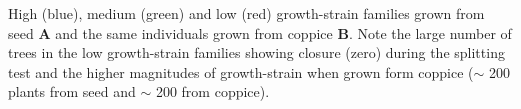 High (blue), medium (green) and low (red) growth-strain families grown from seed \textbf{A} and the same individuals grown from coppice \textbf{B}. Note the large number of trees in the low growth-strain families showing closure (zero) during the splitting test and the higher magnitudes of growth-strain when grown form coppice (\(\sim\) 200 plants from seed and \(\sim\) 200 from coppice).